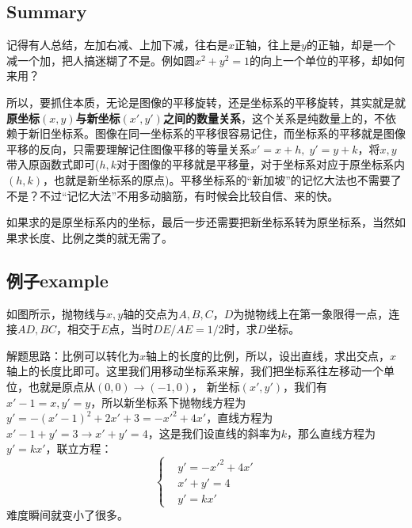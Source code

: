 \documentclass[../main.tex]{subfiles}
\begin{document}
\subsection{Summary}
记得有人总结，左加右减、上加下减，往右是$x$正轴，往上是$y$的正轴，却是一个减一个加，把人搞迷糊了不是。例如圆$x^2+y^2=1$的向上一个单位的平移，却如何来用？

所以，要抓住本质，无论是图像的平移旋转，还是坐标系的平移旋转，其实就是就\textbf{原坐标$(x,y)$与新坐标$(x',y')$之间的数量关系}，这个关系是纯数量上的，不依赖于新旧坐标系。图像在同一坐标系的平移很容易记住，而坐标系的平移就是图像平移的反向，只需要理解记住图像平移的等量关系$x'=x+h, \; y'=y+k$，将$x,y$带入原函数式即可($h,k$对于图像的平移就是平移量，对于坐标系对应于原坐标系内$(h,k)$，也就是新坐标系的原点)。平移坐标系的“新加坡”的记忆大法也不需要了不是？不过“记忆大法”不用多动脑筋，有时候会比较自信、来的快。

如果求的是原坐标系内的坐标，最后一步还需要把新坐标系转为原坐标系，当然如果求长度、比例之类的就无需了。

\subsection{例子example}
\begin{minipage}[c]{0.4\textwidth}
\end{minipage}
\begin{minipage}[l]{0.6\textwidth}
  如图所示，抛物线与$x,y$轴的交点为$A,B,C$，$D$为抛物线上在第一象限得一点，连接$AD,BC$，相交于$E$点，当时$DE/AE=1/2$时，求$D$坐标。
\end{minipage}

解题思路：比例可以转化为$x$轴上的长度的比例，所以，设出直线，求出交点，$x$轴上的长度比即可。这里我们用移动坐标系来解，我们把坐标系往左移动一个单位，也就是原点从$(0,0)\rightarrow(-1,0)$，
新坐标$(x',y')$，我们有$x'-1=x, y'=y$，所以新坐标系下抛物线方程为$y'=-(x'-1)^2+2x'+3=-x'^2+4x'$，直线方程为$x'-1+y'=3 \rightarrow x'+y'=4$，这是我们设直线的斜率为$k$，那么直线方程为
$y'=kx'$，联立方程：
\[
  \left\{
    \begin{aligned}
     & y'=-x'^2+4x'\\
     & x'+y'=4\\
     & y'=kx'
    \end{aligned}
  \right.
\]
难度瞬间就变小了很多。
\end{document}
